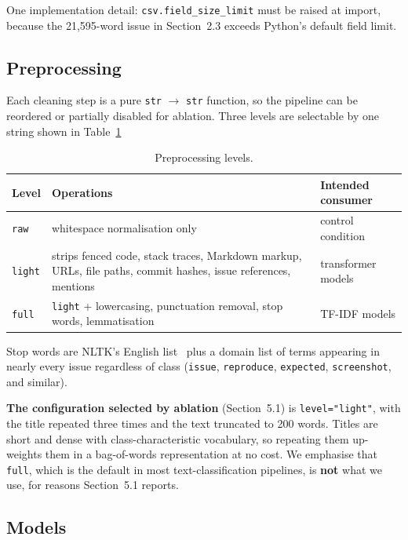 One implementation detail: \texttt{csv.field\_size\_limit} must be raised at
import, because the 21,595-word issue in Section~2.3 exceeds Python's default
field limit.
 
\subsection{Preprocessing}
\label{sec:preprocessing}
 
Each cleaning step is a pure \texttt{str} $\rightarrow$ \texttt{str} function, so
the pipeline can be reordered or partially disabled for ablation. Three levels are
selectable by one string shown in Table~\ref{tab:preprocessing-levels}
 
\begin{table}[htbp]
  \centering
  \begin{tabular}{@{}l p{7.5cm} l@{}}
    \toprule
    Level & Operations & Intended consumer \\
    \midrule
    \texttt{raw}   & whitespace normalisation only & control condition \\
    \texttt{light} & strips fenced code, stack traces, Markdown markup, URLs,
                     file paths, commit hashes, issue references, mentions
                   & transformer models \\
    \texttt{full}  & \texttt{light} + lowercasing, punctuation removal, stop
                     words, lemmatisation
                   & TF-IDF models \\
    \bottomrule
  \end{tabular}
  \caption{Preprocessing levels.}
  \label{tab:preprocessing-levels}
\end{table}
 
Stop words are NLTK's English list~\cite{bird2009nltk} plus a domain list of terms appearing in
nearly every issue regardless of class (\texttt{issue}, \texttt{reproduce},
\texttt{expected}, \texttt{screenshot}, and similar).
 
\textbf{The configuration selected by ablation} (Section~5.1) is
\texttt{level="light"}, with the title repeated three times and the text truncated
to 200 words. Titles are short and dense with class-characteristic vocabulary, so
repeating them up-weights them in a bag-of-words representation at no cost. We
emphasise that \texttt{full}, which is the default in most text-classification
pipelines, is \textbf{not} what we use, for reasons Section~5.1 reports.
 
\subsection{Models}
\label{sec:models}
 
